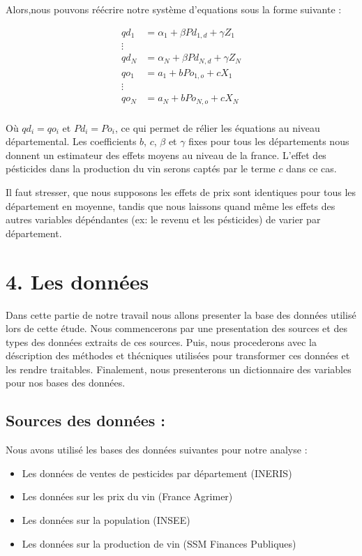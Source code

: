 \documentclass[11pt,]{article}
\providecommand{\tightlist}{%
  \setlength{\itemsep}{0pt}\setlength{\parskip}{0pt}}
\begin{document}
Alors,nous pouvons réécrire notre système d'equations sous la forme
suivante :

\begin{align*}
  qd_1 & = \alpha_{1} + \beta Pd_{1,d} + \gamma Z_{1} \\
  \vdots \\ 
  qd_N & = \alpha_{N} + \beta Pd_{N,d} + \gamma Z_{N} \\
  qo_1 & = a_1 + b Po_{1,o} + c X_{1} \\ 
  \vdots \\ 
  qo_N & = a_N + b Po_{N,o} + c X_{N} \\
\end{align*}

Où \(qd_i = qo_i\) et \(Pd_i = Po_i\), ce qui permet de rélier les
équations au niveau départemental. Les coefficients \(b\), \(c\),
\(\beta\) et \(\gamma\) fixes pour tous les départements nous donnent un
estimateur des effets moyens au niveau de la france. L'effet des
pésticides dans la production du vin serons captés par le terme \(c\)
dans ce cas.

Il faut stresser, que nous supposons les effets de prix sont identiques
pour tous les département en moyenne, tandis que nous laissons quand
même les effets des autres variables dépéndantes (ex: le revenu et les
pésticides) de varier par département.

\hypertarget{les-donnees}{%
\section{4. Les données}\label{les-donnees}}

Dans cette partie de notre travail nous allons presenter la base des
données utilisé lors de cette étude. Nous commencerons par une
presentation des sources et des types des données extraits de ces
sources. Puis, nous procederons avec la déscription des méthodes et
thécniques utilisées pour transformer ces données et les rendre
traitables. Finalement, nous presenterons un dictionnaire des variables
pour nos bases des données.

\hypertarget{sources-des-donnees}{%
\subsection{Sources des données :}\label{sources-des-donnees}}

Nous avons utilisé les bases des données suivantes pour notre analyse :

\begin{itemize}
\tightlist
\item
  Les données de ventes de pesticides par département (INERIS)
\item
  Les données sur les prix du vin (France Agrimer)
\item
  Les données sur la population (INSEE)
\item
  Les données sur la production de vin (SSM Finances Publiques)
\end{itemize}
\end{document}
